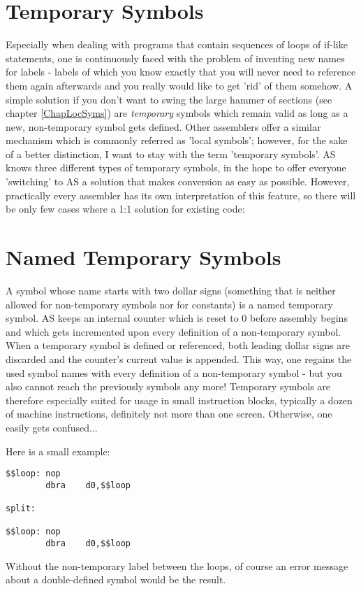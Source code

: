\documentclass[12pt,twoside]{report}
\newcommand{\asname}{{AS}}
\begin{document}

\section{Temporary Symbols}

Especially when dealing with programs that contain sequences of loops of
if-like statements, one is continuously faced with the problem of
inventing new names for labels - labels of which you know exactly that you
will never need to reference them again afterwards and you really would
like to get 'rid' of them somehow.  A simple solution if you don't want to
swing the large hammer of sections (see chapter \ref{ChapLocSyms}) are
{\em temporary} symbols which remain valid as long as a new,
non-temporary symbol gets defined.  Other assemblers offer a similar
mechanism which is commonly referred as 'local symbols'; however, for the
sake of a better distinction, I want to stay with the term 'temporary
symbols'.  \asname{} knows three different types of temporary symbols, in the
hope to offer everyone 'switching' to \asname{} a solution that makes conversion
as easy as possible.  However, practically every assembler has its own
interpretation of this feature, so there will be only few cases where a
1:1 solution for existing code:

\section{Named Temporary Symbols}

A symbol whose name starts with two dollar signs (something that is
neither allowed for non-temporary symbols nor for constants) is a named
temporary symbol.  \asname{} keeps an internal counter which is reset to 0 before
assembly begins and which gets incremented upon every definition of a
non-temporary symbol.  When a temporary symbol is defined or referenced,
both leading dollar signs are discarded and the counter's current value is
appended.  This way, one regains the used symbol names with every
definition of a non-temporary symbol - but you also cannot reach the
previously symbols any more! Temporary symbols are therefore especially
suited for usage in small instruction blocks, typically a dozen of machine
instructions, definitely not more than one screen.  Otherwise, one easily
gets confused...

Here is a small example:
\begin{verbatim}
$$loop: nop
        dbra    d0,$$loop

split:

$$loop: nop
        dbra    d0,$$loop
\end{verbatim}
Without the non-temporary label between the loops, of course an error
message about a double-defined symbol would be the result.
\end{document}
